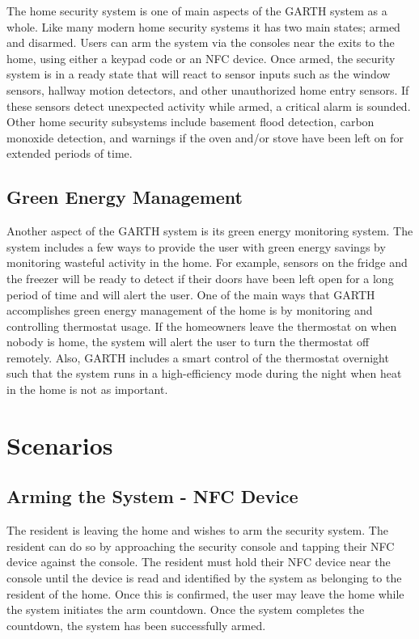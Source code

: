 \documentclass{report}
\begin{document}
The home security system is one of main aspects of the GARTH system as a
whole. Like many modern home security systems it has two main states; armed
and disarmed. Users can arm the system via the consoles near the exits to the
home, using either a keypad code or an NFC device. Once armed, the security
system is in a ready state that will react to sensor inputs such as the window
sensors, hallway motion detectors, and other unauthorized home entry sensors.
If these sensors detect unexpected activity while armed, a critical alarm is sounded.
Other home security subsystems include basement flood detection, carbon 
monoxide detection, and warnings if the oven and/or stove have been left on
for extended periods of time.

\subsection{Green Energy Management}

Another aspect of the GARTH system is its green energy monitoring system. The
system includes a few ways to provide the user with green energy savings by
monitoring wasteful activity in the home. For example, sensors on the fridge and 
the freezer will be ready to detect if their doors have been left open for a long period
of time and will alert the user. One of the main ways that GARTH accomplishes
green energy management of the home is by monitoring and controlling thermostat 
usage. If the homeowners leave the thermostat on when nobody is home, the
system will alert the user to turn the thermostat off remotely. Also, GARTH includes
a smart control of the thermostat overnight such that the system runs in a high-efficiency
mode during the night when heat in the home is not as important.

\section{Scenarios}

\subsection*{Arming the System - NFC Device}

The resident is leaving the home and wishes to arm the security system. The
resident can do so by approaching the security console and tapping their NFC
device against the console. The resident must hold their NFC
device near the console until the device is read and identified by the system
as belonging to the resident of the home. Once this is confirmed, the user may
leave the home while the system initiates the arm countdown. Once the system
completes the countdown, the system has been successfully armed.
\end{document}
